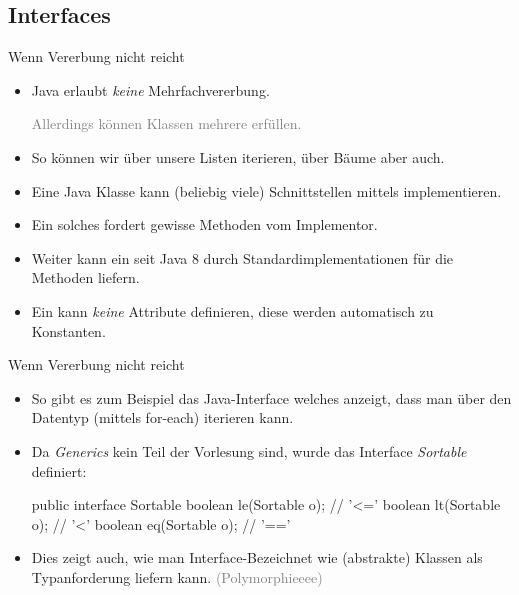 \subsection{Interfaces}
\begin{frame}{Wenn Vererbung nicht reicht}
    \begin{itemize}[<+(1)->]
        \widei
        \item Java erlaubt \emph{keine} Mehrfachvererbung.\pause{}\par \textcolor{gray}{Allerdings können Klassen mehrere  erfüllen.}
        \item So können wir über unsere Listen iterieren,\pause{} über Bäume aber auch.
        \item Eine Java Klasse kann (beliebig viele) Schnittstellen mittels  implementieren.
        \item Ein solches  fordert gewisse Methoden vom Implementor.
        \item Weiter kann ein  seit Java \(8\) durch  Standardimplementationen für die Methoden liefern.
        \item Ein  kann \emph{keine} Attribute definieren, diese werden automatisch zu Konstanten.
    \end{itemize}
\end{frame}

\begin{frame}[fragile]{Wenn Vererbung nicht reicht}
    \begin{itemize}[<+(1)->]
        \widei
        \item \label{mrk:int-iterable}So gibt es zum Beispiel das Java-Interface  welches anzeigt, dass man über den Datentyp (mittels for-each) iterieren kann.
        \item Da \emph{Generics} kein Teil der Vorlesung sind, wurde das Interface \emph{Sortable} definiert:\pause{}
\begin{plainjava}
public interface Sortable {
    boolean le(Sortable o); // '<='
    boolean lt(Sortable o); // '<'
    boolean eq(Sortable o); // '=='
}
\end{plainjava}
        \item Dies zeigt auch, wie man Interface-Bezeichnet wie (abstrakte) Klassen als Typanforderung liefern kann. \textcolor{gray}{(Polymorphieeee)}
    \end{itemize}
\end{frame}

